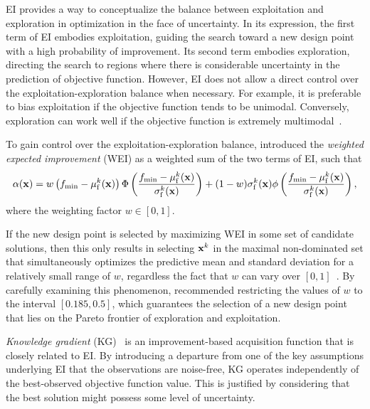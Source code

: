 \documentclass[journal ]{new-aiaa}
\newcommand{\edit}[1]{\textcolor{red!80!black}{#1}} %
\begin{document}
	EI provides a way to conceptualize the balance between exploitation and exploration in optimization in the face of uncertainty.
	In its expression, the first term of EI embodies exploitation, guiding the search toward a new design point with a high probability of improvement.
	Its second term embodies exploration, directing the search to regions where there is considerable uncertainty in the prediction of objective function.
	However, EI does not allow a direct control over the exploitation-exploration balance when necessary.
	For example, it is preferable to bias exploitation if the objective function tends to be unimodal.
	Conversely, exploration can work well if the objective function is extremely multimodal~\citep{Sobester2005}.
	
	To gain control over the exploitation-exploration balance, \citet{Sobester2005} introduced the \textit{weighted expected improvement} (WEI) as a weighted sum of the two terms of EI, such that
	\begin{equation}\label{eqn40}
		\alpha({\bf x})  = w\left( f_\text{min}-\mu_\text{f}^k({\bf x})\right)\Phi\left(\frac{f_\text{min}-\mu_\text{f}^k({\bf x})}{\sigma_\text{f}^k({\bf x})}\right)
		+(1-w)\sigma_\text{f}^k({\bf x})\phi\left(\frac{f_\text{min}-\mu_\text{f}^k({\bf x})}{\sigma_\text{f}^k({\bf x})}\right),
	\end{equation}
	where the weighting factor $w \in [0,1]$.
	
	If the new design point is selected by maximizing WEI in some set of candidate solutions, then this only results in selecting ${\bf x}^k$ in the maximal non-dominated set \edit{that simultaneously optimizes the predictive mean and standard deviation} for a relatively small range of $w$, regardless the fact that $w$ can vary over $[0,1]$~\citep{Ath2021}.
	By carefully examining this phenomenon, \citet{Ath2021} recommended restricting the values of $w$ to the interval $[0.185,0.5]$, which guarantees the selection of a new design point that lies on the Pareto frontier of \edit{exploration and exploitation}.
	
	\textit{Knowledge gradient} (KG)~\citep{Frazier2008} is an improvement-based acquisition function that is closely related to EI.
	By introducing a departure from one of the key assumptions underlying EI that the observations are noise-free, KG operates independently of the best-observed objective function value.
	This is justified by considering that the best solution might possess some level of uncertainty.
	
\end{document}
